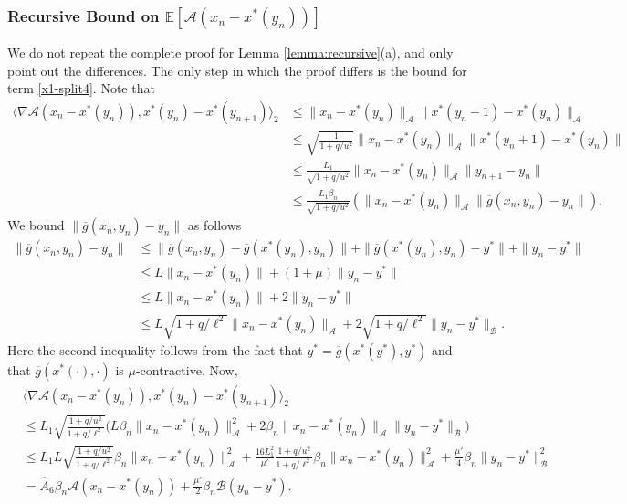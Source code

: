 \documentclass[letterpaper, 10 pt, conference]{ieeeconf}  %
\theoremstyle{definition}
\theoremstyle{plain}
\newcommand{\barg}{\overline{g}}
\newcommand{\xstar}{x^*}
\newcommand{\ystar}{y^*}
\newcommand{\hA}{\hat{A}}
\newcommand{\EE}{\mathbb{E}}
\newcommand{\Acal}{\mathcal{A}}
\newcommand{\Bcal}{\mathcal{B}}
\begin{document}
\subsubsection{\textbf{Recursive Bound on $\EE[\Acal(x_n-\xstar(y_n))]$}}
We do not repeat the complete proof for Lemma \ref{lemma:recursive}(a), and only point out the differences. The only step in which the proof differs is the bound for term \eqref{x1-split4}. Note that 
\begin{align*}
    \langle\nabla \Acal(x_n-\xstar(y_n)),\xstar(y_n)-\xstar(y_{n+1})\rangle_2&\stackrel{}{\leq} \|x_n-\xstar(y_n)\|_\Acal\|\xstar(y_n+1)-\xstar(y_n)\|_\Acal\\
    &\stackrel{}{\leq} \sqrt{\frac{1}{1+q/u^2}}\|x_n-\xstar(y_n)\|_\Acal\|\xstar(y_n+1)-\xstar(y_n)\|\\
    &\stackrel{}{\leq} \frac{L_1}{\sqrt{1+q/u^2}}\|x_n-\xstar(y_n)\|_\Acal\|y_{n+1}-y_n\|\\
    &\stackrel{}{\leq} \frac{L_1\beta_n}{\sqrt{1+q/u^2}}\left(\|x_n-\xstar(y_n)\|_\Acal\|\barg(x_n,y_n)-y_n\|\right).
\end{align*}
We bound $\|\barg(x_n,y_n)-y_n\|$ as follows
\begin{align*}
    \|\barg(x_n,y_n)-y_n\|&\leq \|\barg(x_n,y_n)-\barg(\xstar(y_n),y_n)\|+\|\barg(\xstar(y_n),y_n)-\ystar\|+\|y_n-\ystar\|\\
    &\leq L\|x_n-\xstar(y_n)\|+(1+\mu)\|y_n-\ystar\|\\
    &\leq L\|x_n-\xstar(y_n)\|+2\|y_n-\ystar\|\\
    &\leq L\sqrt{1+q/\ell^2}\|x_n-\xstar(y_n)\|_\Acal+2\sqrt{1+q/\ell^2}\|y_n-\ystar\|_\Bcal.
\end{align*}
Here the second inequality follows from the fact that $\ystar=\barg(\xstar(\ystar),\ystar)$ and that $\barg(\xstar(\cdot),\cdot)$ is $\mu$-contractive. Now,
\begin{align*}
    &\langle\nabla \Acal(x_n-\xstar(y_n)),\xstar(y_n)-\xstar(y_{n+1})\rangle_2\\
    &\leq L_1\sqrt{\frac{1+q/u^2}{1+q/\ell^2}}\Big(L\beta_n\|x_n-\xstar(y_n)\|_\Acal^2+2\beta_n\|x_n-\xstar(y_n)\|_\Acal\|y_n-\ystar\|_\Bcal\Big)\\
    &\leq L_1L\sqrt{\frac{1+q/u^2}{1+q/\ell^2}}\beta_n\|x_n-\xstar(y_n)\|_\Acal^2+\frac{16L_1^2}{\mu'}\frac{1+q/u^2}{1+q/\ell^2}\beta_n\|x_n-\xstar(y_n)\|^2_\Acal+\frac{\mu'}{4}\beta_n\|y_n-\ystar\|^2_\Bcal\\
    &= \hA_6\beta_n\Acal(x_n-\xstar(y_n))+\frac{\mu'}{2}\beta_n\Bcal(y_n-\ystar).
\end{align*}
\end{document}
